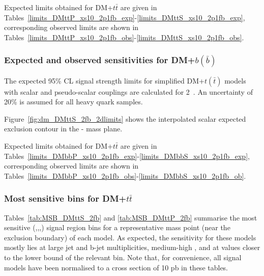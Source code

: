 

\clearpage
Expected limits obtained for DM+$t\bar{t}$ are given in Tables~\ref{limits_DMttP_xs10_2p1fb_exp}-\ref{limits_DMttS_xs10_2p1fb_exp}, corresponding observed limits are shown in Tables~\ref{limits_DMttP_xs10_2p1fb_obs}-\ref{limits_DMttS_xs10_2p1fb_obs}.







\clearpage

\subsubsection{Expected and observed sensitivities for DM+$b(\bar{b})$}

The expected 95\% CL signal strength limits for simplified DM+$t(\bar{t})$ models with scalar and
pseudo-scalar couplings are calculated for 2~\ifb. An uncertainty of 20\% is assumed for all 
heavy quark samples.


Figure~\ref{fig:dm_DMttS_2fb_2dlimits} shows the interpolated scalar expected 
exclusion contour in the {\mphi-\mchi} mass plane.


\clearpage
Expected limits obtained for DM+$t\bar{t}$ are given in Tables~\ref{limits_DMbbP_xs10_2p1fb_exp}-\ref{limits_DMbbS_xs10_2p1fb_exp}, corresponding observed limits are shown in Tables~\ref{limits_DMbbP_xs10_2p1fb_obs}-\ref{limits_DMbbS_xs10_2p1fb_ob}.








\clearpage

\subsubsection{Most sensitive bins for DM+$t\bar{t}$}

Tables~\ref{tab:MSB_DMttS_2fb} and \ref{tab:MSB_DMttP_2fb} summarise the most sensitive 
{(\njet,\nb,\scalht,\mht)} signal region
bins for a representative mass point (near the exclusion boundary) of each \DMtt
model. As expected, the sensitivity for these models mostly lies at large jet and b-jet
multiplicities, medium-high \scalht, and at \mht values closer to the lower bound
of the relevant \scalht bin. Note that, for convenience, all signal models have
been normalised to a cross section of 10 pb in these tables.


